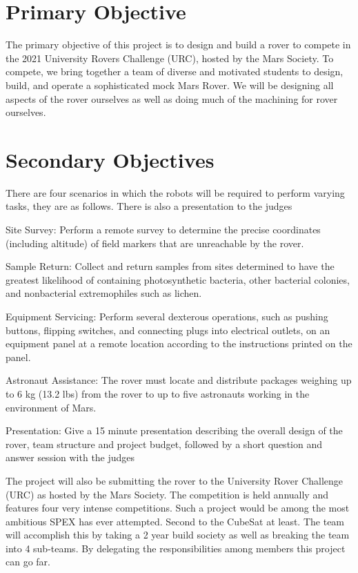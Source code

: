 \documentclass[conference]{IEEEtran} %
\begin{document}
\section{Primary Objective}
\label{sec:primary-obj}
The primary objective of this project is to design and build a rover to compete in the 2021 University Rovers Challenge (URC), hosted by the Mars Society. To compete, we bring together a team of diverse and motivated students to design, build, and operate a sophisticated mock Mars Rover. We will be designing all aspects of the rover ourselves as well as doing much of the machining for rover ourselves. 

\section{Secondary Objectives}
\label{sec:secondary-obj}
 There are four scenarios in which the robots will be required to perform varying tasks, they are as follows. There is also a presentation to the judges
 
Site Survey: Perform a remote survey to determine the precise coordinates (including altitude) of field markers that are unreachable by the rover.
 
Sample Return: Collect and return samples from sites determined to have the greatest likelihood of containing photosynthetic bacteria, other bacterial colonies, and nonbacterial extremophiles such as lichen.
 
Equipment Servicing: Perform several dexterous operations, such as pushing buttons, flipping switches, and connecting plugs into electrical outlets, on an equipment panel at a remote location according to the instructions printed on the panel.
 
Astronaut Assistance: The rover must locate and distribute packages weighing up to 6 kg (13.2 lbs) from the rover to up to five astronauts working in the environment of Mars.
 
Presentation: Give a 15 minute presentation describing the overall design of the rover, team structure and project budget, followed by a short question and answer session with the judges

The project will also be submitting the rover to the University Rover Challenge (URC) as hosted by the Mars Society. The competition is held annually and features four very intense competitions. Such a project would be among the most ambitious SPEX has ever attempted. Second to the CubeSat at least. The team will accomplish this by taking a 2 year build society as well as breaking the team into 4 sub-teams. By delegating the responsibilities among members this project can go far.
\end{document}
